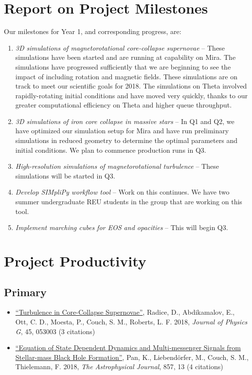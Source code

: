 \documentclass[12pt,titlepage]{article}
\begin{document}
\section{Report on Project Milestones}

Our milestones for Year 1, and corresponding progress, are:
\begin{enumerate}
  \item {\it 3D simulations of magnetorotational core-collapse supernovae} -- These simulations have been started and are running at capability on Mira. The simulations have progressed sufficiently that we are beginning to see the impact of including rotation and magnetic fields. These simulations are on track to meet our scientific goals for 2018. The simulations on Theta involved rapidly-rotating initial conditions and have moved very quickly, thanks to our greater computational efficiency on Theta and higher queue throughput.
  \item {\it 3D simulations of iron core collapse in massive stars} -- In Q1 and Q2, we have optimized our simulation setup for Mira and have run preliminary simulations in reduced geometry to determine the optimal parameters and initial conditions. We plan to commence production runs in Q3.
  \item {\it High-resolution simulations of magnetorotational turbulence} -- These simulations will be started in Q3.
  \item {\it Develop SIMpliPy workflow tool} -- Work on this continues. We have two summer undergraduate REU students in the group that are working on this tool.
  \item {\it Implement marching cubes for EOS and opacities} -- This will begin Q3.
\end{enumerate}



\section{Project Productivity}

\subsection{Primary}

\begin{itemize}
  \item \href{http://adsabs.harvard.edu/abs/2018JPhG...45e3003R}{``Turbulence in Core-Collapse Supernovae''}, Radice, D., Abdikamalov, E., Ott, C. D., Moesta, P., Couch, S. M., Roberts, L. F. 2018, {\itshape Journal of Physics G}, 45, 053003 (3 citations)
  \item \href{https://ui.adsabs.harvard.edu/#abs/2018ApJ...857...13P/abstract}{``Equation of State Dependent Dynamics and Multi-messenger Signals from Stellar-mass Black Hole Formation''}, Pan, K., Liebend\"orfer, M., Couch, S. M., Thielemann, F. 2018, {\itshape The Astrophysical Journal}, 857, 13 (4 citations)
\end{itemize}
\end{document}
